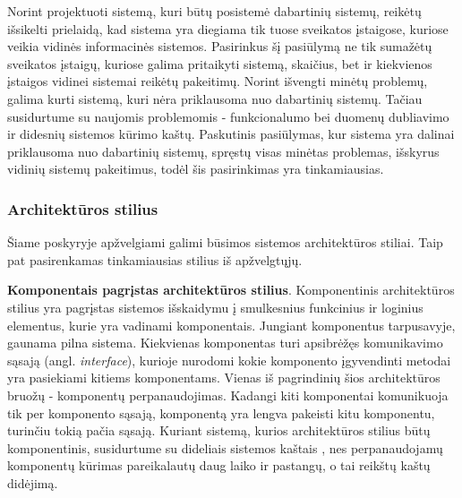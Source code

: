 Norint projektuoti sistemą, kuri būtų posistemė dabartinių sistemų, reikėtų išsikelti prielaidą, kad sistema yra diegiama tik tuose sveikatos įstaigose, kuriose veikia vidinės informacinės sistemos. Pasirinkus šį pasiūlymą ne tik sumažėtų sveikatos įstaigų, kuriose galima pritaikyti sistemą, skaičius, bet ir kiekvienos įstaigos vidinei sistemai reikėtų pakeitimų. Norint išvengti minėtų problemų, galima kurti sistemą, kuri nėra priklausoma nuo dabartinių sistemų. Tačiau susidurtume su naujomis problemomis - funkcionalumo bei duomenų dubliavimo ir didesnių sistemos kūrimo kaštų. Paskutinis pasiūlymas, kur sistema yra dalinai priklausoma nuo dabartinių sistemų, spręstų visas minėtas problemas, išskyrus vidinių sistemų pakeitimus, todėl šis pasirinkimas yra tinkamiausias.


\subsubsection{Architektūros stilius}
Šiame poskyryje apžvelgiami galimi būsimos sistemos architektūros stiliai. Taip pat pasirenkamas tinkamiausias stilius iš apžvelgtųjų. 

\textbf{Komponentais pagrįstas architektūros stilius}. Komponentinis architektūros stilius yra pagrįstas sistemos išskaidymu į smulkesnius funkcinius ir loginius elementus, kurie yra vadinami komponentais. Jungiant komponentus tarpusavyje, gaunama pilna sistema. Kiekvienas komponentas turi apsibrėžęs komunikavimo sąsają (angl. \textit{interface}), kurioje nurodomi kokie komponento įgyvendinti metodai yra pasiekiami kitiems komponentams. Vienas iš pagrindinių šios architektūros bruožų - komponentų perpanaudojimas. Kadangi kiti komponentai komunikuoja tik per komponento sąsają, komponentą yra lengva pakeisti kitu komponentu, turinčiu tokią pačia sąsają. Kuriant sistemą, kurios architektūros stilius būtų komponentinis, susidurtume su dideliais sistemos kaštais \cite{Component}, nes perpanaudojamų komponentų kūrimas pareikalautų daug laiko ir pastangų, o tai reikštų kaštų didėjimą.

